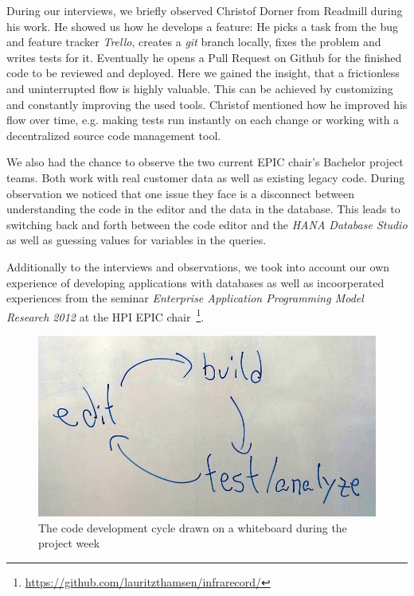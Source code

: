 
During our interviews, we briefly observed Christof Dorner from Readmill during his work. He showed us how he develops a feature: He picks a task from the bug and feature tracker \emph{Trello}, creates a \emph{git} branch locally, fixes the problem and writes tests for it. Eventually he opens a Pull Request on Github for the finished code to be reviewed and deployed. Here we gained the insight, that a frictionless and uninterrupted flow is highly valuable. This can be achieved by customizing and constantly improving the used tools. Christof mentioned how he improved his flow over time, e.g. making tests run instantly on each change or working with a decentralized source code management tool.

We also had the chance to observe the two current EPIC chair's Bachelor project teams. Both work with real customer data as well as existing legacy code. During observation we noticed that one issue they face is a disconnect between understanding the code in the editor and the data in the database. This leads to switching back and forth between the code editor and the \emph{HANA Database Studio} as well as guessing values for variables in the queries.

Additionally to the interviews and observations, we took into account our own experience of developing applications with databases as well as incoorperated experiences from the seminar \emph{Enterprise Application Programming Model Research 2012} at the HPI EPIC chair~\footnote{\url{https://github.com/lauritzthamsen/infrarecord/}}.

\begin{figure}
    \includegraphics[width=\linewidth]{images/EditBuildTest.jpg}
    \caption{The code development cycle drawn on a whiteboard during the project week}
    \label{fig:cycle}
\end{figure}


